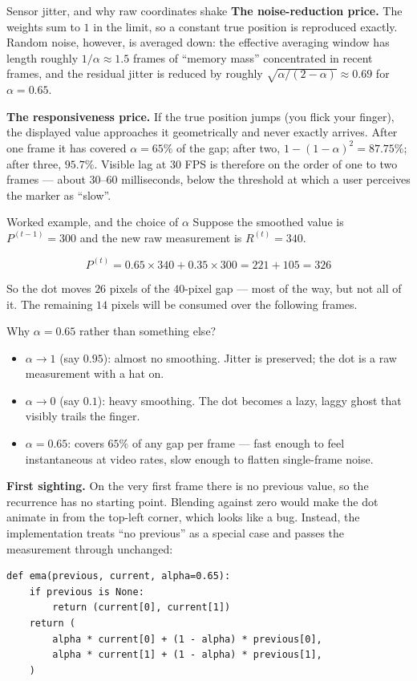 \begin{mathdeepdive}{Sensor jitter, and why raw coordinates shake}
\textbf{The noise-reduction price.} The weights sum to $1$ in the limit, so a constant true position
is reproduced exactly. Random noise, however, is averaged down: the effective averaging window has
length roughly $1/\alpha \approx 1.5$ frames of ``memory mass'' concentrated in recent frames, and
the residual jitter is reduced by roughly $\sqrt{\alpha/(2-\alpha)} \approx 0.69$ for
$\alpha = 0.65$.

\textbf{The responsiveness price.} If the true position jumps (you flick your finger), the displayed
value approaches it geometrically and never exactly arrives. After one frame it has covered
$\alpha = 65\%$ of the gap; after two, $1-(1-\alpha)^2 = 87.75\%$; after three, $95.7\%$. Visible
lag at 30 FPS is therefore on the order of one to two frames --- about 30--60 milliseconds, below the
threshold at which a user perceives the marker as ``slow''.
\end{mathdeepdive}

\begin{mathdeepdive}{Worked example, and the choice of $\alpha$}
Suppose the smoothed value is $P^{(t-1)} = 300$ and the new raw measurement is $R^{(t)} = 340$.

$$P^{(t)} = 0.65 \times 340 + 0.35 \times 300 = 221 + 105 = 326$$

So the dot moves $26$ pixels of the $40$-pixel gap --- most of the way, but not all of it. The
remaining $14$ pixels will be consumed over the following frames.

Why $\alpha = 0.65$ rather than something else?

\begin{itemize}
  \item $\alpha \to 1$ (say $0.95$): almost no smoothing. Jitter is preserved; the dot is a raw
        measurement with a hat on.
  \item $\alpha \to 0$ (say $0.1$): heavy smoothing. The dot becomes a lazy, laggy ghost that
        visibly trails the finger.
  \item $\alpha = 0.65$: covers $65\%$ of any gap per frame --- fast enough to feel instantaneous at
        video rates, slow enough to flatten single-frame noise.
\end{itemize}

\textbf{First sighting.} On the very first frame there is no previous value, so the recurrence has no
starting point. Blending against zero would make the dot animate in from the top-left corner, which
looks like a bug. Instead, the implementation treats ``no previous'' as a special case and passes the
measurement through unchanged:

\begin{lstlisting}
def ema(previous, current, alpha=0.65):
    if previous is None:
        return (current[0], current[1])
    return (
        alpha * current[0] + (1 - alpha) * previous[0],
        alpha * current[1] + (1 - alpha) * previous[1],
    )
\end{lstlisting}
\end{mathdeepdive}

